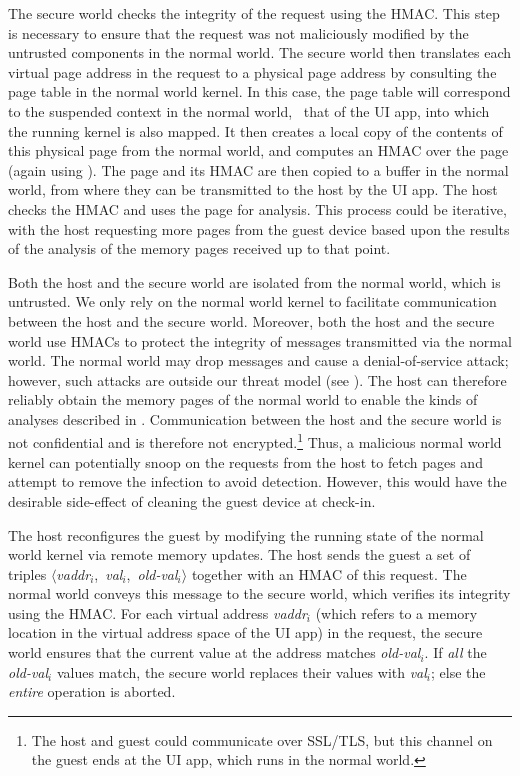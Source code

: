 The secure world checks the integrity of the request using the HMAC. This step
is necessary to ensure that the request was not maliciously modified by the
untrusted components in the normal world. The secure world then translates each
virtual page address in the request to a physical page address by consulting
the page table in the normal world kernel. In this case, the page table will
correspond to the suspended context in the normal world, \ie~that of the UI
app, into which the running kernel is also mapped.  It then creates a local
copy of the contents of this physical page from the normal world, and computes
an HMAC over the page (again using \ks). The page and its HMAC are then copied
to a buffer in the normal world, from where they can be transmitted to the host
by the UI app.  The host checks the HMAC and uses the page for analysis. This
process could be iterative, with the host requesting more pages from the guest
device based upon the results of the analysis of the memory pages received up
to that point.

Both the host and the secure world are isolated from the normal world, which is
untrusted. We only rely on the normal world kernel to facilitate communication
between the host and the secure world. Moreover, both the host and the secure
world use HMACs to protect the integrity of messages transmitted via the normal
world.  The normal world may drop messages and cause a denial-of-service
attack; however, such attacks are outside our threat model (see
). The host can therefore reliably obtain the memory
pages of the normal world to enable the kinds of analyses described in
. Communication between the host and the secure world
is not confidential and is therefore not encrypted.\footnote{The host and guest
could communicate over SSL/TLS, but this channel on the guest ends at the UI
app, which runs in the normal world.} Thus, a malicious normal world kernel can
potentially snoop on the requests from the host to fetch pages and attempt to
remove the infection to avoid detection. However, this would have the desirable
side-effect of cleaning the guest device at check-in.

%
The host reconfigures the guest by modifying the running state of the normal
world kernel via remote memory updates. The host sends the guest a set of
triples
$\langle$\textit{vaddr}$_i$,~\textit{val}$_i$,~\textit{old-val}$_i$$\rangle$
together with an HMAC of this request. The normal world conveys this message to
the secure world, which verifies its integrity using the HMAC.  For each
virtual address \textit{vaddr}$_i$ (which refers to a memory location in the
virtual address space of the UI app) in the request, the secure world ensures
that the current value at the address matches \textit{old-val}$_i$. If
\textit{all} the \textit{old-val}$_i$ values match, the secure world replaces
their values with \textit{val}$_i$; else the \textit{entire} operation is
aborted.

